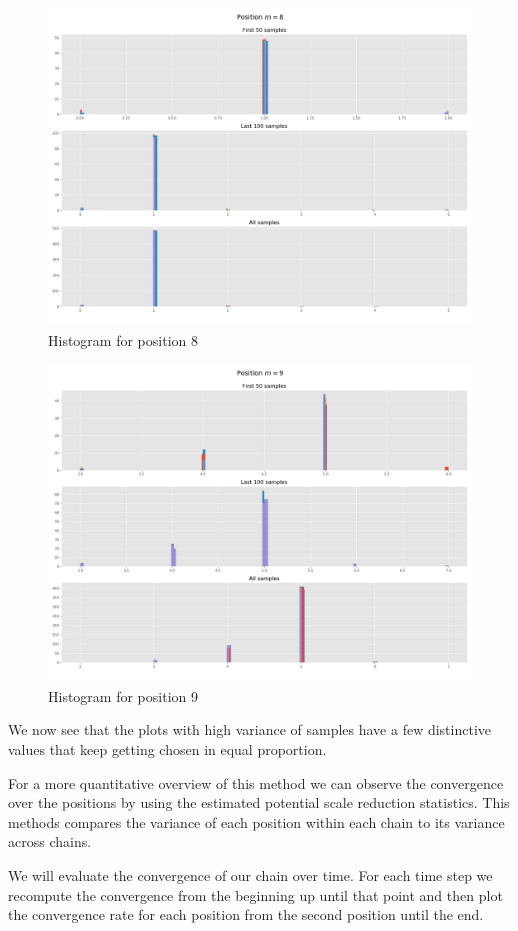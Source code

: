 \documentclass[]{article}
\begin{document}
\begin{figure}[H]
	\begin{center}
		
		\includegraphics[width=.5\textwidth]{task4/figures/T_2_4/Q2/distribution_pos8.png}
		\caption*{Histogram for position 8}
	\end{center}
\end{figure}

\begin{figure}[H]
	\begin{center}
		
		\includegraphics[width=.5\textwidth]{task4/figures/T_2_4/Q2/distribution_pos9.png}
		\caption*{Histogram for position 9}
	\end{center}
\end{figure}

We now see that the plots with high variance of samples have a few distinctive values that keep getting chosen in equal proportion.

For a more quantitative overview of this method we can observe the convergence over the positions by using the estimated potential scale reduction statistics. This methods compares the variance of each position within each chain to its variance across chains.

We will evaluate the convergence of our chain over time. For each time step we recompute the convergence from the beginning up until that point and then plot the convergence rate for each position from the second position until the end.
\end{document}
